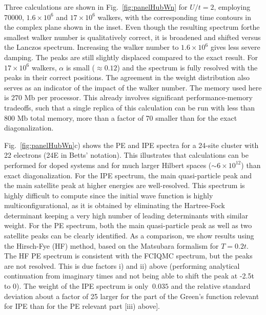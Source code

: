 \documentclass[aps,prl,twocolumn,showpacs,superscriptaddress,floatfix]{revtex4-1}
\begin{document}
Three calculations are shown in Fig.~\ref{fig:panelHubWn} for $U/t=2$, employing 70000, $1.6\times 10^6$ and $17\times10^6$ walkers, with the 
corresponding time contours in the complex plane shown in the inset.  Even
though the resulting spectrum forthe smallest walker number is qualitatively correct, it is
broadened and shifted versus the Lanczos spectrum. Increasing the walker number to $1.6\times 10^6$ gives less severe damping. The 
peaks are still slightly displaced compared to the exact result. For $17\times10^6$ walkers, $\alpha$ is small ($\approx 0.12$) and the spectrum is
 fully resolved with the peaks in their correct positions. The
agreement in the weight distribution also serves as an indicator of the impact
of the walker number. The memory used here is
 270 Mb per processor. This already involves significant performance-memory
 tradeoffs, such that a single replica of this calculation can be run with
 less than 800 Mb total memory, more than a factor of 70 smaller than for 
the exact diagonalization.

Fig.~\ref{fig:panelHubWn}c) shows the PE and IPE spectra for a 24-site cluster with 
22 electrons (24E in Betts' notation\cite{Bett}). This illustrates that 
calculations can be performed for doped systems and for much larger Hilbert spaces 
($\sim 6 \times 10^{12}$) than exact diagonalization. For
the IPE spectrum, the main
quasi-particle peak and the main satellite peak at higher energies are
well-resolved. This spectrum is highly difficult to compute since the initial wave function is highly
multiconfigurational, as it is obtained by eliminating the Hartree-Fock
determinant keeping a very high number of leading determinants with similar
weight. For the PE spectrum, both the main quasi-particle peak as
well as two satellite peaks can be clearly identified. As a comparison, we show 
results using the Hirsch-Fye (HF) method,\cite{HF} based on the Matsubara
formalism for $T=0.2t$.
The HF PE spectrum is consistent with the FCIQMC spectrum, but the peaks are not 
resolved. This is due factors i) and ii) above (performing analytical
continuation from imaginary times and not being able to shift the peak at
-2.5t to 0). The weight
of the IPE spectrum is only $~0.035$ and the relative standard deviation 
about a factor of 25 larger for the part of the Green's function relevant for IPE 
than for the PE relevant part [iii) above].
\end{document}
